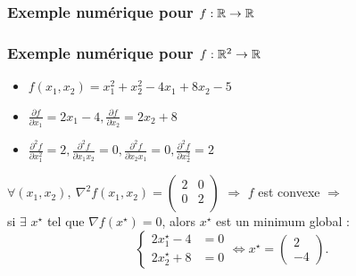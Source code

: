 \documentclass{beamer}
\newcommand{\R}{{\ensuremath\mathbb{R}}}
\begin{document}
\begin{frame}
  \frametitle{Exemple numérique pour $f:\R \rightarrow \R$}

  
\end{frame}

\begin{frame}
  \frametitle{Exemple numérique pour $f:\R^2 \rightarrow \R$}

  \begin{itemize}
  \item $f(x_1,x_2) = x_1^2 + x_2^2 - 4x_1 + 8x_2 - 5$
  \item $\frac{\partial f}{\partial x_1} = 2x_1 - 4, \frac{\partial f}{\partial x_2} = 2x_2 + 8$
  \item $\frac{\partial^2 f}{\partial x_1^2} = 2, \frac{\partial^2 f}{\partial x_1x_2} = 0, \frac{\partial^2 f}{\partial x_2x_1} = 0, \frac{\partial^2 f}{\partial x_2^2} = 2$
  \end{itemize}

  
  $\forall (x_1,x_2), \ \nabla^2f(x_1,x_2) =
  \left(\begin{array}{cc}
    2 & 0 \\
    0 & 2 \\
  \end{array}
  \right)
  $ $\Rightarrow$ $f$ est convexe $\Rightarrow$ \\
  si $\exists$ $x^\star$ tel que ${\nabla f}(x^\star) = 0$,
  alors $x^\star$ est un minimum global : 
  \[
  \left\{
  \begin{array}{ll}
    2x^\star_1 - 4 & = 0\\
    2x^\star_2 + 8 & = 0
  \end{array}
  \right.
  \Leftrightarrow x^\star = 
  \begin{pmatrix}
   2 \\
   -4 
  \end{pmatrix}.
  \]
  
\end{frame}
\end{document}
